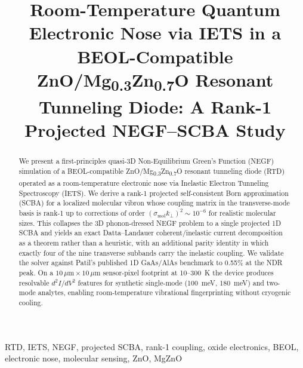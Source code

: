 \documentclass[conference]{IEEEtran}
\begin{document}
\title{Room-Temperature Quantum Electronic Nose via IETS in a BEOL-Compatible
ZnO/Mg\textsubscript{0.3}Zn\textsubscript{0.7}O Resonant Tunneling Diode:
A Rank-1 Projected NEGF--SCBA Study}

\author{%
\and
\IEEEauthorblockN{[Advisor]}
}

\maketitle

\begin{abstract}
We present a first-principles quasi-3D Non-Equilibrium Green's Function
(NEGF) simulation of a BEOL-compatible ZnO/Mg\textsubscript{0.3}Zn\textsubscript{0.7}O
resonant tunneling diode (RTD) operated as a room-temperature
electronic nose via Inelastic Electron Tunneling Spectroscopy (IETS). We
derive a rank-1 projected self-consistent Born approximation (SCBA) for a
localized molecular vibron whose coupling matrix in the transverse-mode
basis is rank-1 up to corrections of order
$(\sigma_{\mathrm{mol}} k_\perp)^2 \sim 10^{-6}$ for realistic
molecular sizes. This collapses the 3D phonon-dressed NEGF problem to a
single projected 1D SCBA and yields an exact Datta--Landauer
coherent/inelastic current decomposition as a theorem rather than a
heuristic, with an additional parity identity in which exactly four of the
nine transverse subbands carry the inelastic coupling. We validate the
solver against Patil's published 1D GaAs/AlAs benchmark to 0.55\% at the
NDR peak. On a
$10\,\mu\mathrm{m} \times 10\,\mu\mathrm{m}$ sensor-pixel footprint at
10--300~K the device produces resolvable $d^2I/dV^2$ features for
synthetic single-mode (100~meV, 180~meV) and two-mode analytes, enabling
room-temperature vibrational fingerprinting without cryogenic cooling.
\end{abstract}

\begin{IEEEkeywords}
RTD, IETS, NEGF, projected SCBA, rank-1 coupling, oxide electronics, BEOL,
electronic nose, molecular sensing, ZnO, MgZnO
\end{IEEEkeywords}
\end{document}
